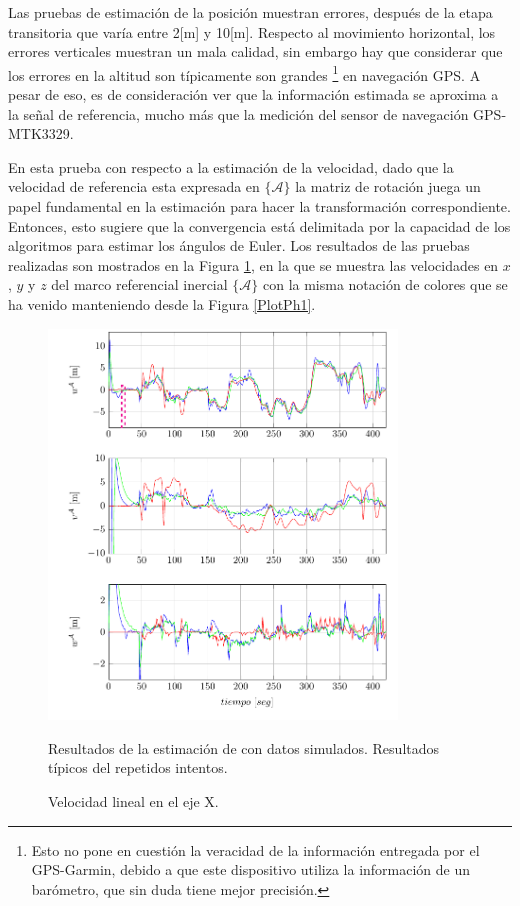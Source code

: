 \documentclass[conference]{IEEEtran}
\newcommand{\marco}[1]{\{\mathcal{#1}\}}
\begin{document}
Las pruebas de estimación de la posición muestran errores, después de la etapa transitoria que varía entre 2[m] y 10[m]. Respecto al movimiento horizontal, los errores verticales muestran un mala calidad, sin embargo hay que considerar que los errores en la altitud son típicamente son grandes \footnote{Esto no pone en cuestión la veracidad de la información entregada por el GPS-Garmin, debido a que este dispositivo utiliza la información de un barómetro, que sin duda tiene mejor precisión.} en navegación GPS. A pesar de eso, es de consideración ver que la información estimada se aproxima a la señal de referencia, mucho más que la medición del sensor de navegación GPS-MTK3329. \par
En esta prueba con respecto a la estimación de la velocidad, dado que la velocidad de referencia esta expresada en $\marco{A}$ la matriz de rotación juega un papel fundamental en la estimación para hacer la transformación correspondiente. Entonces, esto sugiere que la convergencia está delimitada por la capacidad de los algoritmos para estimar los ángulos de Euler. Los resultados de las pruebas realizadas son mostrados en la Figura \ref{PlotU1}, en la que se muestra las velocidades en $x$, $y$ y $z$ del marco referencial inercial $\marco{A}$ con la misma notación de colores que se ha venido manteniendo desde la Figura \ref{PlotPh1}.\par
\begin{figure}
\begin{center}
\includegraphics[width=25em]
{PlotVelocity1.pdf}
\caption{Velocidad lineal en el eje X.}
\scriptsize{Resultados de la estimación de con datos simulados. Resultados típicos del repetidos intentos.}
\label{PlotU1}
\end{center}
\end{figure}
\end{document}
